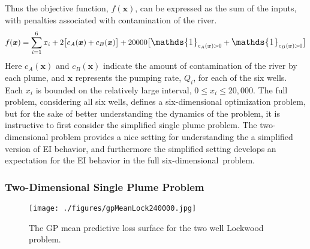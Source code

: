\documentclass[12pt]{article}
\def \oner {
	\mathlarger{\mathds{1}}
}
\begin{document}
	Thus the objective function, $f(\bm{x})$, can be expressed as the sum of the inputs, with penalties associated with contamination of the river. %
	\begin{equation}
	f(\bm{x}) = \sum_{i=1}^6 x_i +  2\big[ c_A(\bm{x}) + c_B(\bm{x}) \big] + 20000 \big[ \oner_{c_A(\bm{x})>0} + \oner_{c_B(\bm{x})>0} \big] 
	\end{equation}
	Here $c_A(\bm{x})$ and $c_B(\bm{x})$ indicate the amount of contamination of the river by each plume, and $\bm{x}$ represents the pumping rate, $Q_i$, for each of the six wells.
	Each $x_i$ is bounded on the relatively large interval, \mbox{$0\le x_i\le20,000$}. 
	The full problem, considering all six wells, defines a six-dimensional optimization problem, but for the sake of better understanding the dynamics of the problem, it is instructive to first consider the simplified single plume problem. 
	The two-dimensional problem provides a nice setting for understanding the a simplified version of EI behavior, and furthermore the simplified setting develops an expectation for the EI behavior in the full \mbox{six-dimensional problem.}
	
	\subsubsection{Two-Dimensional Single Plume Problem}
	
	\begin{wrapfigure}{l}{0.5\textwidth}
	\vspace{-1.1cm}
	\hspace{-1cm}
	\texttt{[image: ./figures/gpMeanLock240000.jpg]}
	\vspace{-0.9cm}
	\caption{The GP mean predictive loss surface for the two well Lockwood problem. }
	\label{lockGP}
	\end{wrapfigure}
	
\end{document}
